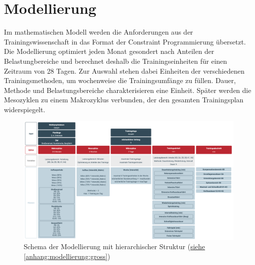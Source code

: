\chapter{Modellierung}
\label{sec:modellierung}
Im mathematischen Modell werden die Anforderungen aus der Trainingswissenschaft in das Format der Constraint Programmierung übersetzt. Die Modellierung optimiert jeden Monat gesondert nach Anteilen der Belastungbereiche und berechnet deshalb die Trainingseinheiten für einen Zeitraum von 28 Tagen. Zur Auswahl stehen dabei Einheiten der verschiedenen Trainingsmethoden, um wochenweise die Trainingsumfänge zu füllen. Dauer, Methode und Belastungsbereiche charakterisieren eine Einheit. Später werden die Mesozyklen zu einem Makrozyklus verbunden, der den gesamten Trainingsplan widerspiegelt.
\begin{figure}[h]
    \includegraphics[width=\textwidth,height=\textheight, keepaspectratio]{gfx/modellierung.png}
    \caption{Schema der Modellierung mit hierarchischer Struktur (\hyperref[anhang:modellierung:gross]{siehe \ref{anhang:modellierung:gross}})}
    \label{abbildung:modellierung:schema}
\end{figure}
